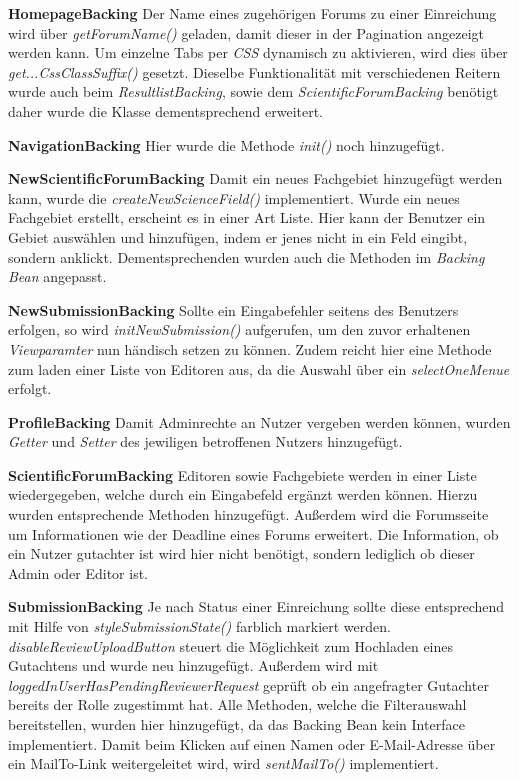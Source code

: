 \textbf{HomepageBacking} Der Name eines zugehörigen Forums zu einer Einreichung wird über \emph{getForumName()} geladen, damit dieser in der Pagination angezeigt werden kann. \newline
Um einzelne Tabs per \emph{CSS} dynamisch zu aktivieren, wird dies über \emph{get...CssClassSuffix()} gesetzt. Dieselbe Funktionalität mit verschiedenen Reitern wurde auch beim \emph{ResultlistBacking}, sowie dem \emph{ScientificForumBacking} benötigt daher wurde die Klasse dementsprechend erweitert.

\textbf{NavigationBacking} Hier wurde die Methode \emph{init()} noch hinzugefügt.

\textbf{NewScientificForumBacking} Damit ein neues Fachgebiet hinzugefügt werden kann, wurde die \emph{createNewScienceField()} implementiert. Wurde ein neues Fachgebiet erstellt, erscheint es in einer Art Liste. Hier kann der Benutzer ein Gebiet auswählen und hinzufügen, indem er jenes nicht in ein Feld eingibt, sondern anklickt. Dementsprechenden wurden auch die Methoden im \emph{Backing Bean} angepasst.

\textbf{NewSubmissionBacking} Sollte ein Eingabefehler seitens des Benutzers erfolgen, so  wird \emph{initNewSubmission()} aufgerufen, um den zuvor erhaltenen \emph{Viewparamter} nun händisch setzen zu können.\newline
Zudem reicht hier eine Methode zum laden einer Liste von Editoren aus, da die Auswahl über ein \emph{selectOneMenue} erfolgt.

\textbf{ProfileBacking} Damit Adminrechte an Nutzer vergeben werden können, wurden \emph{Getter} und \emph{Setter} des jewiligen betroffenen Nutzers hinzugefügt.

\textbf{ScientificForumBacking} Editoren sowie Fachgebiete werden in einer Liste wiedergegeben, welche durch ein Eingabefeld ergänzt werden können. Hierzu wurden entsprechende Methoden hinzugefügt. \newline
Außerdem wird die Forumsseite um Informationen wie der Deadline eines Forums erweitert.\newline
Die Information, ob ein Nutzer gutachter ist wird hier nicht benötigt, sondern lediglich ob dieser Admin oder Editor ist.

\textbf{SubmissionBacking} Je nach Status einer Einreichung sollte diese entsprechend mit Hilfe von \emph{styleSubmissionState()} farblich markiert werden. \newline
\emph{disableReviewUploadButton} steuert die Möglichkeit zum Hochladen eines Gutachtens und wurde neu hinzugefügt. Außerdem wird mit  \emph{loggedInUserHasPendingReviewerRequest} geprüft ob ein angefragter Gutachter bereits der Rolle zugestimmt hat. \newline
Alle Methoden, welche die Filterauswahl bereitstellen, wurden hier hinzugefügt, da das Backing Bean kein Interface implementiert.
\newline Damit beim Klicken auf einen Namen oder E-Mail-Adresse über ein MailTo-Link weitergeleitet wird, wird \emph{sentMailTo()} implementiert.

